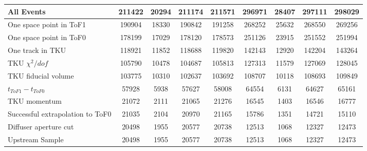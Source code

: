 \begin{landscape}
\begin{table}
\begin{tabular}[pos]{l|cccccccc}
\hline                                            
All Events                                         &  211422  &   20294  &  211174  &  211571  &  296971  &   28407  &  297111  &  298029  \\
\hline                                            
One space point in ToF1                            &  190904  &   18330  &  190842  &  191258  &  268252  &   25632  &  268550  &  269256  \\
One space point in ToF0                            &  178199  &   17029  &  178120  &  178573  &  251126  &   23915  &  251552  &  251994  \\
One track in TKU                                   &  118921  &   11852  &  118688  &  119820  &  142143  &   12920  &  142204  &  143264  \\
TKU $\chi^2/dof$                                   &  105790  &   10478  &  104687  &  105813  &  127313  &   11579  &  127069  &  128045  \\
TKU fiducial volume                                &  103775  &   10310  &  102637  &  103692  &  108707  &   10118  &  108693  &  109849  \\
\hline                                            
$t_{ToF1} - t_{ToF0}$                              &   57928  &    5938  &   57627  &   58008  &   64554  &    6131  &   64627  &   65161  \\
TKU momentum                                       &   21072  &    2111  &   21065  &   21276  &   16545  &    1403  &   16546  &   16777  \\
\hline                                            
Successful extrapolation to ToF0                   &   21035  &    2104  &   20970  &   21165  &   15786  &    1351  &   14721  &   15110  \\
Diffuser aperture cut                              &   20498  &    1955  &   20577  &   20738  &   12513  &    1068  &   12327  &   12473  \\
\hline                                            
Upstream Sample                                    &   20498  &    1955  &   20577  &   20738  &   12513  &    1068  &   12327  &   12473  \\
\hline                                            

\end{tabular}
\end{table}
\end{landscape}

